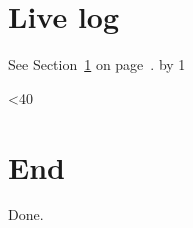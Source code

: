\documentclass{article}
\begin{document}
\section{Live log}\label{sec:live}
See Section~\ref{sec:live} on page~\pageref{sec:end}.
\loop
  \advance\tick by 1
  \immediate{}
\ifnum\tick<40 \repeat
\section{End}\label{sec:end}
Done.
\end{document}
